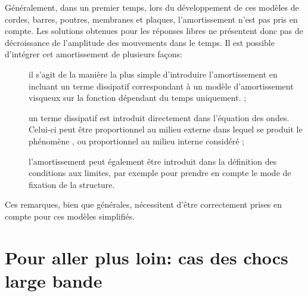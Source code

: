 \medskip
Généralement, dans un premier temps, lors du développement de ces modèles de cordes, barres, poutres, membranes et plaques, l'amortissement n'est pas pris en compte. Les solutions obtenues pour les réponses libres ne présentent donc pas de décroissance de l'amplitude des mouvements dans le temps. Il est possible d'intégrer cet amortissement de plusieurs façons:
\begin{description}
  \item[] il s'agit de la manière la plus simple d'introduire l'amortissement en incluant un terme dissipatif correspondant à un modèle d'amortissement visqueux sur la fonction dépendant du temps uniquement. ;	
  \item[]
	un terme dissipatif est introduit directement dans l'équation des ondes. Celui-ci peut être proportionnel au milieu externe dans lequel se produit le phénomène , ou proportionnel au milieu interne considéré ;
  \item[] l'amortissement peut également être introduit dans la définition des conditions aux limites, par exemple pour prendre en compte le mode de fixation de la structure. 
\end{description}

Ces remarques, bien que générales, nécessitent d'être correctement prises en compte pour ces modèles simplifiés.


\medskip
\section{Pour aller plus loin: cas des chocs large bande}\label{Sec-choc}


